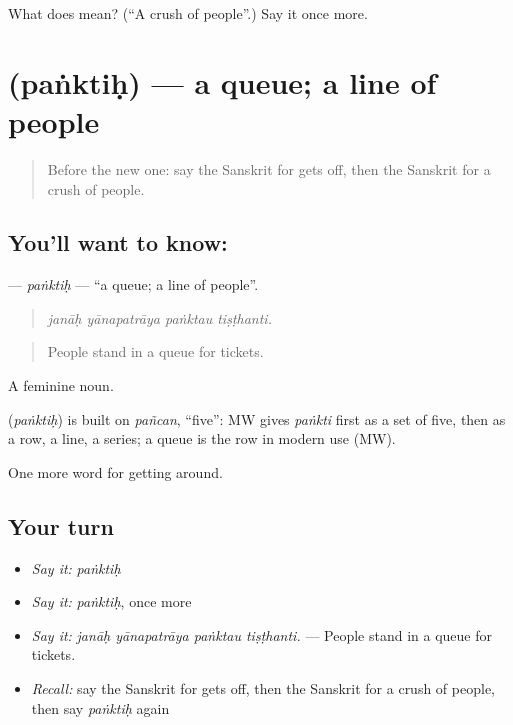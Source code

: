 \begin{tcolorbox}[breakable,colback=teal!4,colframe=teal!35!black,title={Before you move on}]
What does  mean? (\textquotedblleft{}A crush of people\textquotedblright{}.) Say it once more.
\end{tcolorbox}
\section[\texorpdfstring{\sk{पंक्तिः} (paṅktiḥ)}{पंक्तिः (paṅktiḥ)}]{ (paṅktiḥ) — a queue; a line of people}

\label{lesson:SA-C406-panktih}



\begin{quote}
Before the new one: say the Sanskrit for gets off, then the Sanskrit for a crush of people.
\end{quote}

\subsection*{You'll want to know: }
\textbf{} — \emph{paṅktiḥ} — \textquotedblleft{}a queue; a line of people\textquotedblright{}.

\begin{quote}
   
\end{quote}

\begin{quote}
\emph{janāḥ yānapatrāya paṅktau tiṣṭhanti.}
\end{quote}

\begin{quote}
People stand in a queue for tickets.
\end{quote}

A feminine noun.

\begin{cousinweb}
\textbf{} (\emph{paṅktiḥ}) is built on \emph{pañcan}, \textquotedblleft{}five\textquotedblright{}: MW gives \emph{paṅkti} first as a set of five, then as a row, a line, a series; a queue is the row in modern use (MW).
\end{cousinweb}

\begin{grammarlens}[title={What you've built}]
One more word for getting around.
\end{grammarlens}

\subsection*{Your turn}
\begin{itemize}
\raggedright
  \item \emph{Say it:} \emph{paṅktiḥ}
  \item \emph{Say it:} \emph{paṅktiḥ}, once more
  \item \emph{Say it:} \emph{janāḥ yānapatrāya paṅktau tiṣṭhanti.} — People stand in a queue for tickets.
  \item \emph{Recall:} say the Sanskrit for gets off, then the Sanskrit for a crush of people, then say \emph{paṅktiḥ} again
\end{itemize}

